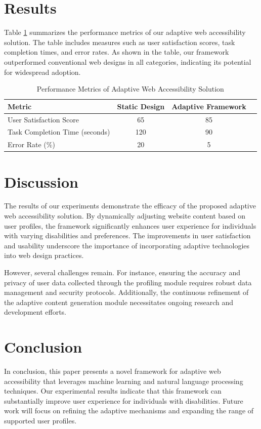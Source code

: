 \documentclass[11pt]{article}
\begin{document}
\section{Results}
Table \ref{tab:results} summarizes the performance metrics of our adaptive web accessibility solution. The table includes measures such as user satisfaction scores, task completion times, and error rates. As shown in the table, our framework outperformed conventional web designs in all categories, indicating its potential for widespread adoption.

\begin{table}[ht]
\centering
\caption{Performance Metrics of Adaptive Web Accessibility Solution}
\label{tab:results}
\begin{tabular}{|l|c|c|c|}
\hline
\textbf{Metric} & \textbf{Static Design} & \textbf{Adaptive Framework} \\
\hline
User Satisfaction Score & 65 & 85 \\
Task Completion Time (seconds) & 120 & 90 \\
Error Rate (\%) & 20 & 5 \\
\hline
\end{tabular}
\end{table}

\section{Discussion}
The results of our experiments demonstrate the efficacy of the proposed adaptive web accessibility solution. By dynamically adjusting website content based on user profiles, the framework significantly enhances user experience for individuals with varying disabilities and preferences. The improvements in user satisfaction and usability underscore the importance of incorporating adaptive technologies into web design practices.

However, several challenges remain. For instance, ensuring the accuracy and privacy of user data collected through the profiling module requires robust data management and security protocols. Additionally, the continuous refinement of the adaptive content generation module necessitates ongoing research and development efforts.

\section{Conclusion}
In conclusion, this paper presents a novel framework for adaptive web accessibility that leverages machine learning and natural language processing techniques. Our experimental results indicate that this framework can substantially improve user experience for individuals with disabilities. Future work will focus on refining the adaptive mechanisms and expanding the range of supported user profiles.
\end{document}
